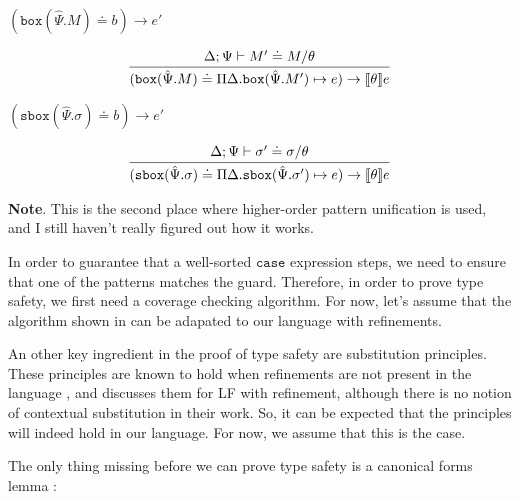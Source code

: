 \documentclass[letterpaper, 11pt]{article}
\newcommand{\rar}{\rightarrow}
\newcommand{\case}{\texttt{case}}
\newcommand{\bbox}{\texttt{box}}
\newcommand{\sbbox}{\texttt{sbox}}
\begin{document}
    $\boxed{(\bbox(\hat{\Psi}.M) \doteq b) \rar e'}$

    \begin{align*}
      \infer{(\bbox(\hat{\Psi}.M) \doteq \Pi \Delta. \bbox(\hat{\Psi}. M') \mapsto e) \rar \llbracket \theta \rrbracket e}
            {
              \Delta; \Psi \vdash M' \doteq M / \theta
            }
    \end{align*}

    $\boxed{(\sbbox(\hat{\Psi}.\sigma) \doteq b) \rar e'}$

    \begin{align*}
      \infer{(\sbbox(\hat{\Psi}.\sigma) \doteq \Pi \Delta. \sbbox(\hat{\Psi}. \sigma') \mapsto e) \rar \llbracket \theta \rrbracket e}
            {
              \Delta; \Psi \vdash \sigma' \doteq \sigma / \theta
            }
    \end{align*}

    \textbf{Note}.  This is the second place where higher-order pattern unification is used, and I still haven't really figured out how it works.

    In order to guarantee that a well-sorted $\case$ expression steps, we need to ensure that one of the patterns matches the guard.  Therefore, in order
    to prove type safety, we first need a coverage checking algorithm.  For now, let's assume that the algorithm shown in \cite{DunfieldPientka2008} can 
    be adapated to our language with refinements.  

    An other key ingredient in the proof of type safety are substitution principles.  These principles are known to hold when refinements are not present 
    in the language \cite{PientkaDunfield2008, Nanevski2008}, and \cite{LovasPfenning2010} discusses them for LF with refinement, although there is no notion
    of contextual substitution in their work.  So, it can be expected that the principles will indeed hold in our language.  For now, we assume that this 
    is the case.

    The only thing missing before we can prove type safety is a canonical forms lemma :
\end{document}
